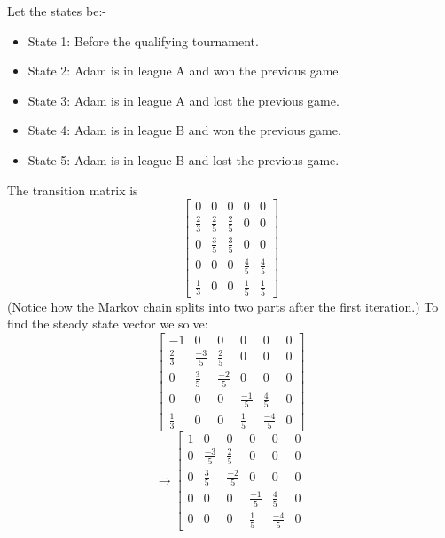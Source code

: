 \documentclass{article}
\begin{document}
\begin{Answer}
  Let the states be:-
  \begin{itemize}
    \item State 1: Before the qualifying tournament.
    \item State 2: Adam is in league A and won the previous game.
    \item State 3: Adam is in league A and lost the previous game.
    \item State 4: Adam is in league B and won the previous game.
    \item State 5: Adam is in league B and lost the previous game.
  \end{itemize}
  The transition matrix is 
  \begin{equation*}
  \left[
  \begin{array}{ccccc}
  0&0&0&0&0\\
  \frac{2}{3} & \frac{2}{5} & \frac{2}{5} & 0&0\\
  0 & \frac{3}{5} & \frac{3}{5} & 0 & 0\\
  0&0&0 &\frac{4}{5} & \frac{4}{5}\\
  \frac{1}{3} & 0 & 0 & \frac{1}{5} & \frac{1}{5}
  \end{array}
  \right]
  \end{equation*}
  (Notice how the Markov chain splits into two parts after the first iteration.)
  To find the steady state vector we solve:
  \begin{equation*}
  \left[
  \begin{array}{ccccc|c}
  -1&0&0&0&0&0\\
  \frac{2}{3} & \frac{-3}{5} & \frac{2}{5} & 0&0&0\\
  0 & \frac{3}{5} & \frac{-2}{5} & 0 & 0&0\\
  0&0&0 &\frac{-1}{5} & \frac{4}{5}&0\\
  \frac{1}{3} & 0 & 0 & \frac{1}{5} & \frac{-4}{5}&0
  \end{array}
  \right]
  \end{equation*}
  \begin{equation*}
  \rightarrow\left[
  \begin{array}{ccccc|c}
  1&0&0&0&0&0\\
  0 & \frac{-3}{5} & \frac{2}{5} & 0&0&0\\
  0 & \frac{3}{5} & \frac{-2}{5} & 0 & 0&0\\
  0&0&0 &\frac{-1}{5} & \frac{4}{5}&0\\
  0 & 0 & 0 & \frac{1}{5} & \frac{-4}{5}&0
  \end{array}

\end{equation*}
\end{Answer}
\end{document}
